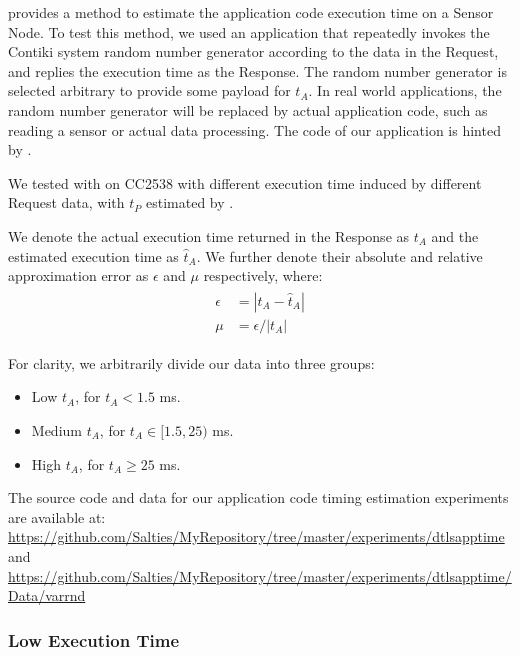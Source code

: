  provides a method to estimate the application code execution time on a Sensor  Node. To test this method, we used an application that repeatedly invokes the Contiki system random number generator according to the data in the Request, and replies the execution time as the Response. The random number generator is selected arbitrary to provide some payload for $t_A$. In real world applications, the random number generator will be replaced by actual application code, such as reading a sensor or actual data processing. The code of our application is hinted by .

 

We tested  with  on CC2538 with different execution time induced by different Request data, with $t_P$ estimated by . 

We denote the actual execution time returned in the Response as $t_A$ and the estimated execution time as $\hat{t}_A$. We further denote their absolute and relative approximation error as $\epsilon$ and $\mu$ respectively, where:
\begin{eqnarray}
	\begin{aligned}
		\epsilon	&= |t_A - \hat{t}_A| \\
		\mu 	&= \epsilon / |t_A|
	\end{aligned}
\end{eqnarray}

For clarity, we arbitrarily divide our data into three groups:
\begin{itemize}
	\item Low $t_A$, for $t_A < 1.5$ ms.
	\item Medium $t_A$, for $t_A \in [1.5, 25)$ ms.
	\item High $t_A$, for $t_A \geq 25$ ms.
\end{itemize}

The source code and data for our application code timing estimation experiments are available at: \\
\url{https://github.com/Salties/MyRepository/tree/master/experiments/dtlsapptime} \\
and \\
\url{https://github.com/Salties/MyRepository/tree/master/experiments/dtlsapptime/Data/varrnd}

\subsubsection{Low Execution Time}

